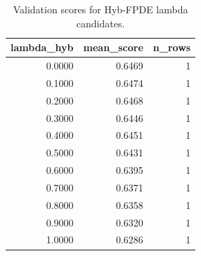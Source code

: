 \begin{table}[t]
\caption{Validation scores for Hyb-FPDE lambda candidates.}
\label{tab:lambda_distribution_computed}
\centering
\begin{tabular}{rrr}
\toprule
lambda\_hyb & mean\_score & n\_rows \\
\midrule
0.0000 & 0.6469 & 1 \\
0.1000 & 0.6474 & 1 \\
0.2000 & 0.6468 & 1 \\
0.3000 & 0.6446 & 1 \\
0.4000 & 0.6451 & 1 \\
0.5000 & 0.6431 & 1 \\
0.6000 & 0.6395 & 1 \\
0.7000 & 0.6371 & 1 \\
0.8000 & 0.6358 & 1 \\
0.9000 & 0.6320 & 1 \\
1.0000 & 0.6286 & 1 \\
\bottomrule
\end{tabular}

\end{table}
